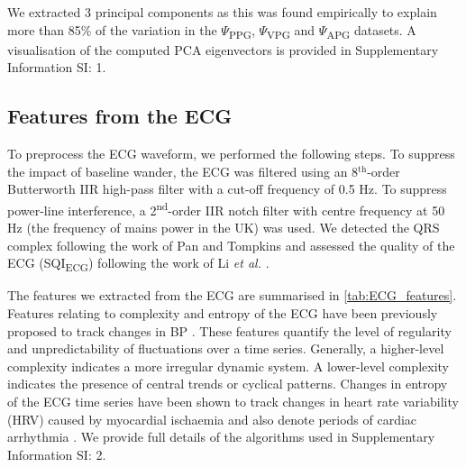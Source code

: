 \documentclass[fleqn,10pt]{wlscirep}
\begin{document}
We extracted 3 principal components as this was found empirically to explain more than 85\% of the variation in the $\Psi$\textsubscript{PPG}, $\Psi$\textsubscript{VPG} and $\Psi$\textsubscript{APG} datasets. A visualisation of the computed PCA eigenvectors is provided in Supplementary Information SI: 1.


\subsection{Features from the ECG}

To preprocess the ECG waveform, we performed the following steps. To suppress the impact of baseline wander, the ECG was filtered using an 8$^{\text{th}}$-order Butterworth IIR high-pass filter with a cut-off frequency of 0.5 Hz. To suppress power-line interference, a 2\textsuperscript{nd}-order IIR notch filter with centre frequency at 50 Hz (the frequency of mains power in the UK) was used. We detected the QRS complex following the work of Pan and Tompkins \cite{Pan1985} and assessed the quality of the ECG (SQI\textsubscript{ECG}) following the work of Li \textit{et al.} \cite{Li2008}.

The features we extracted from the ECG are summarised in \cref{tab:ECG_features}. Features relating to complexity and entropy of the ECG have been previously proposed to track changes in BP \cite{Simjanoska2018, Yang2020}. These features quantify the level of regularity and unpredictability of fluctuations over a time series. Generally, a higher-level complexity indicates a more irregular dynamic system. A lower-level complexity indicates the presence of central trends or cyclical patterns. Changes in entropy of the ECG time series have been shown to track changes in heart rate variability (HRV) caused by myocardial ischaemia \cite{Leonarduzzi2010a} and also denote periods of cardiac arrhythmia \cite{Li2016}. We provide full details of the algorithms used in Supplementary Information SI: 2. 
\end{document}

